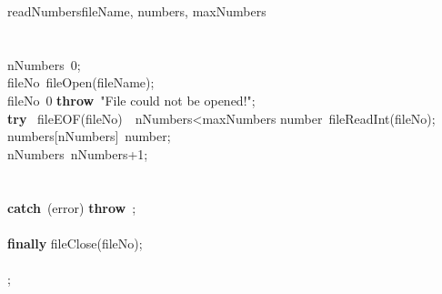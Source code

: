 \documentclass[a4paper,10pt]{article}
\begin{document}
\begin{pseudocode}{readNumbers}{fileName, numbers, maxNumbers }
\label{readNumbers}
\\
\\
\\
  nNumbers\gets\ 0;\\
  fileNo\gets\ fileOpen(fileName);\\
  \IF fileNo\leq\ 0 \THEN
    \textbf{throw}\ "File could not be opened!";\\
  \textbf{try} \BEGIN
    \WHILE \NOT\ fileEOF(fileNo)\ \AND\ nNumbers<maxNumbers \DO
    \BEGIN
      number\gets\ fileReadInt(fileNo);\\
      numbers[nNumbers]\gets\ number;\\
      nNumbers\gets\ nNumbers+1;\\
    \END\\
  \END\\
  \textbf{catch}\ (error)\BEGIN
    \textbf{throw}\ ;\\
  \END\\
  \textbf{finally} \BEGIN
    fileClose(fileNo);\\
  \END\\
  ;\\
\ENDPROCEDURE
\end{pseudocode}
\end{document}
